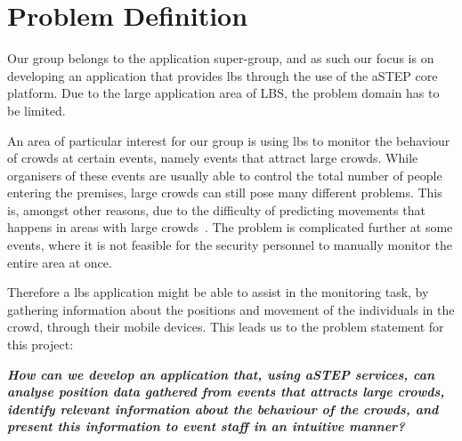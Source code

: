 \section{Problem Definition} \label{sec:problem_def}
Our group belongs to the application super-group, and as such our focus is on developing an application that provides \gls{lbs} through the use of the aSTEP core platform. Due to the large application area of LBS, the problem domain has to be limited.


An area of particular interest for our group is using \gls{lbs} to monitor the behaviour of crowds at certain events, namely events that attract large crowds. While organisers of these events are usually able to control the total number of people entering the premises, large crowds can still pose many different problems. This is, amongst other reasons, due to the difficulty of predicting movements that happens in areas with large crowds~\cite{wirz2012inferring}. The problem is complicated further at some events, where it is not feasible for the security personnel to manually monitor the entire area at once.

Therefore a \gls{lbs} application might be able to assist in the monitoring task, by gathering information about the positions and movement of the individuals in the crowd, through their mobile devices. This leads us to the problem statement for this project:

\vspace{0.5 cm}
\begin{center}
	\textbf{\textit{How can we develop an application that, using aSTEP services, can analyse position data gathered from events that attracts large crowds, identify relevant information about the behaviour of the crowds, and present this information to event staff in an intuitive manner?}}
\end{center}